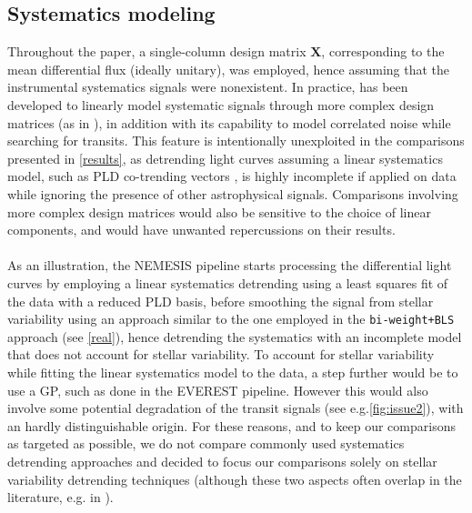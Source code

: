 \documentclass[modern]{aastex631}
\begin{document}
\subsection{Systematics modeling}\label{systematics}
Throughout the paper, a single-column design matrix $\bm{X}$, corresponding to the mean differential flux (ideally unitary), was employed, hence assuming that the instrumental systematics signals were nonexistent. In practice, \nuancemethod{} has been developed to linearly model systematic signals through more complex design matrices (as in \citealt{foreman2016}), in addition with its capability to model correlated noise while searching for transits. This feature is intentionally unexploited in the comparisons presented in \autoref{results}, as detrending light curves assuming a linear systematics model, such as PLD co-trending vectors \citep{pld}, is highly incomplete if applied on data while ignoring the presence of other astrophysical signals. Comparisons involving more complex design matrices would also be sensitive to the choice of linear components, and would have unwanted repercussions on their results.\\\\
As an illustration, the NEMESIS pipeline \citep{nemesis} starts processing the differential light curves by employing a linear systematics detrending using a least squares fit of the data with a reduced PLD basis, before smoothing the signal from stellar variability using an approach similar to the one employed in the \texttt{bi-weight+BLS} approach (see \autoref{real}), hence detrending the systematics with an incomplete model that does not account for stellar variability. To account for stellar variability while fitting the linear systematics model to the data, a step further would be to use a GP, such as done in the EVEREST \citep{everest2} pipeline. However this would also involve some potential degradation of the transit signals (see e.g.\;\autoref{fig:issue2}), with an hardly distinguishable origin. For these reasons, and to keep our comparisons as targeted as possible, we do not compare commonly used systematics detrending approaches and decided to focus our comparisons solely on stellar variability detrending techniques (although these two aspects often overlap in the literature, e.g. in \citealt{everest1}).\\\\
\end{document}

